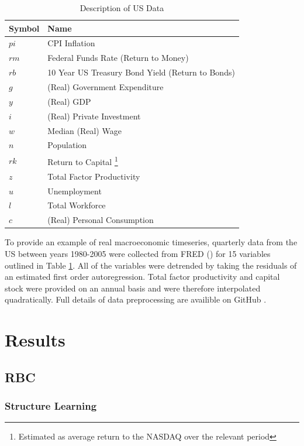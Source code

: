 \documentclass{article}
\begin{document}
\begin{table}
  \centering
  \begin{tabular}{|l|l|}
    \hline
    Symbol & Name \\
    \hline
    $pi$ & CPI Inflation \\
    $rm$ & Federal Funds Rate (Return to Money) \\
    $rb$ & 10 Year US Treasury Bond Yield (Return to Bonds)\\
    $g$ & (Real) Government Expenditure \\
    $y$ & (Real) GDP \\
    $i$ & (Real) Private Investment \\
    $w$ & Median (Real) Wage \\
    $n$ & Population \\
    $rk$ & Return to Capital \footnote{Estimated as average return to the NASDAQ over the relevant period} \\
    $z$ & Total Factor Productivity \\
    $u$ & Unemployment \\
    $l$ & Total Workforce \\
    $c$ & (Real) Personal Consumption \\\cline{2-2}
    \hline
  \end{tabular}
  \caption{Description of US Data}
  \label{tab2}
\end{table}

To provide an example of real macroeconomic timeseries, quarterly data from the US between years 1980-2005 were collected from FRED (\citeyear{fred2020data}) for 15 variables outlined in Table \ref{tab2}. All of the variables were detrended by taking the residuals of an estimated first order autoregression. Total factor productivity and capital stock were provided on an annual basis and were therefore interpolated quadratically. Full details of data preprocessing are availible on GitHub \parencite{hall2020git}.

\section{Results} \label{results}

\subsection{RBC}

\subsubsection{Structure Learning}
\end{document}
